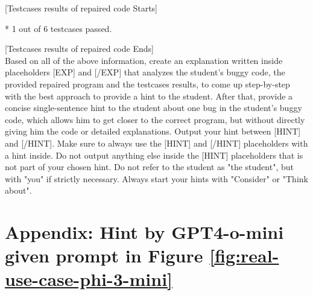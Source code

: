 \documentclass{article}
\begin{document}
\begin{figure*}[h!]
\begin{tcolorbox}[colframe=black!10!white, colback=black!5!white]
\begin{minipage}{\textwidth}
            [Testcases results of repaired code Starts]

            * 1 out of 6 testcases passed.

            [Testcases results of repaired code Ends]\\
            
            Based on all of the above information, create an explanation written inside placeholders [EXP] and [/EXP] that analyzes the student's buggy code, the provided repaired program and the testcases results, to come up step-by-step with the best approach to provide a hint to the student. After that, provide a concise single-sentence hint to the student about one bug in the student's buggy code, which allows him to get closer to the correct program, but without directly giving him the code or detailed explanations. Output your hint between [HINT] and [/HINT]. Make sure to always use the [HINT] and [/HINT] placeholders with a hint inside. Do not output anything else inside the [HINT] placeholders that is not part of your chosen hint. Do not refer to the student as "the student", but with "you" if strictly necessary. Always start your hints with "Consider" or "Think about".
        \end{minipage}
    \end{tcolorbox}
    \caption{An example of the advanced prompt being used to query Phi-3-mini. Notice that the repaired program created by Phi-3-mini passes 1 out of 6 test cases, thus it's not a completely correct repaired program. \emph{Prompt was shortened for brevity.}}
    \label{fig:real-use-case-phi-3-mini}
\end{figure*}

\clearpage 

\section{Appendix: Hint by GPT4-o-mini given prompt in Figure \ref{fig:real-use-case-phi-3-mini}}\label{appendix:real-use-case-phi-3-mini-response}
\end{document}
